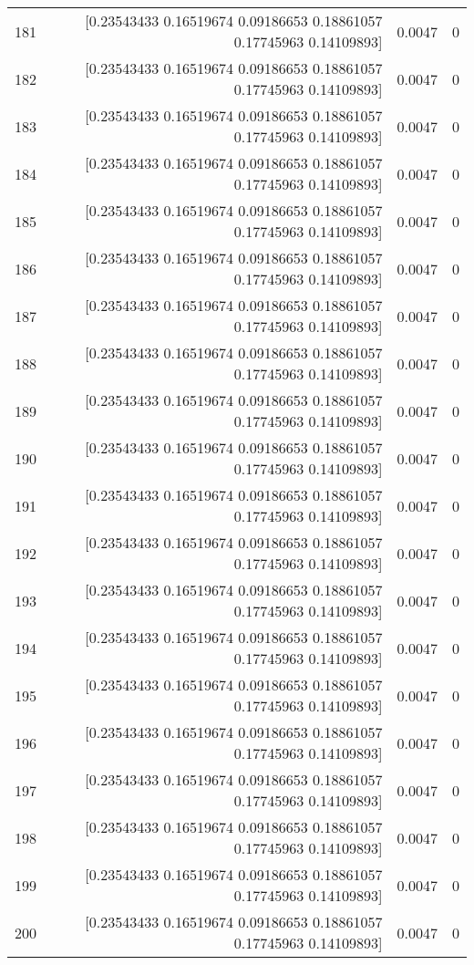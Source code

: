 \begin{longtable}{lrrr}
181 & [0.23543433 0.16519674 0.09186653 0.18861057 0.17745963 0.14109893] & 0.0047 & 0 \\
182 & [0.23543433 0.16519674 0.09186653 0.18861057 0.17745963 0.14109893] & 0.0047 & 0 \\
183 & [0.23543433 0.16519674 0.09186653 0.18861057 0.17745963 0.14109893] & 0.0047 & 0 \\
184 & [0.23543433 0.16519674 0.09186653 0.18861057 0.17745963 0.14109893] & 0.0047 & 0 \\
185 & [0.23543433 0.16519674 0.09186653 0.18861057 0.17745963 0.14109893] & 0.0047 & 0 \\
186 & [0.23543433 0.16519674 0.09186653 0.18861057 0.17745963 0.14109893] & 0.0047 & 0 \\
187 & [0.23543433 0.16519674 0.09186653 0.18861057 0.17745963 0.14109893] & 0.0047 & 0 \\
188 & [0.23543433 0.16519674 0.09186653 0.18861057 0.17745963 0.14109893] & 0.0047 & 0 \\
189 & [0.23543433 0.16519674 0.09186653 0.18861057 0.17745963 0.14109893] & 0.0047 & 0 \\
190 & [0.23543433 0.16519674 0.09186653 0.18861057 0.17745963 0.14109893] & 0.0047 & 0 \\
191 & [0.23543433 0.16519674 0.09186653 0.18861057 0.17745963 0.14109893] & 0.0047 & 0 \\
192 & [0.23543433 0.16519674 0.09186653 0.18861057 0.17745963 0.14109893] & 0.0047 & 0 \\
193 & [0.23543433 0.16519674 0.09186653 0.18861057 0.17745963 0.14109893] & 0.0047 & 0 \\
194 & [0.23543433 0.16519674 0.09186653 0.18861057 0.17745963 0.14109893] & 0.0047 & 0 \\
195 & [0.23543433 0.16519674 0.09186653 0.18861057 0.17745963 0.14109893] & 0.0047 & 0 \\
196 & [0.23543433 0.16519674 0.09186653 0.18861057 0.17745963 0.14109893] & 0.0047 & 0 \\
197 & [0.23543433 0.16519674 0.09186653 0.18861057 0.17745963 0.14109893] & 0.0047 & 0 \\
198 & [0.23543433 0.16519674 0.09186653 0.18861057 0.17745963 0.14109893] & 0.0047 & 0 \\
199 & [0.23543433 0.16519674 0.09186653 0.18861057 0.17745963 0.14109893] & 0.0047 & 0 \\
200 & [0.23543433 0.16519674 0.09186653 0.18861057 0.17745963 0.14109893] & 0.0047 & 0 \\

\end{longtable}
